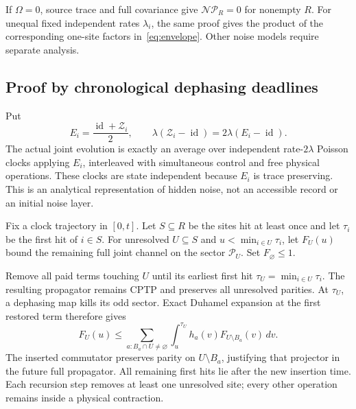 \documentclass[11pt,a4paper]{article}
\newcommand{\id}{\operatorname{id}}
\newcommand{\Pcal}{\mathcal P}
\newcommand{\Ncal}{\mathcal N}
\newcommand{\Zcal}{\mathcal Z}
\begin{document}
If $\Omega=0$, source trace and full covariance give $\Ncal\Pcal_R=0$ for nonempty $R$. For unequal fixed independent rates $\lambda_i$, the same proof gives the product of the corresponding one-site factors in~\eqref{eq:envelope}. Other noise models require separate analysis.

\subsection{Proof by chronological dephasing deadlines}

Put
\begin{equation}
 E_i=\frac{\id+\Zcal_i}{2},\qquad
 \lambda(\Zcal_i-\id)=2\lambda(E_i-\id).
\end{equation}
The actual joint evolution is exactly an average over independent rate-$2\lambda$ Poisson clocks applying $E_i$, interleaved with simultaneous control and free physical operations. These clocks are state independent because $E_i$ is trace preserving. This is an analytical representation of hidden noise, not an accessible record or an initial noise layer.

Fix a clock trajectory in $[0,t]$. Let $S\subseteq R$ be the sites hit at least once and let $\tau_i$ be the first hit of $i\in S$. For unresolved $U\subseteq S$ and $u<\min_{i\in U}\tau_i$, let $F_U(u)$ bound the remaining full joint channel on the sector $\Pcal_U$. Set $F_\varnothing\le1$.

Remove all paid terms touching $U$ until its earliest first hit $\tau_U=\min_{i\in U}\tau_i$. The resulting propagator remains CPTP and preserves all unresolved parities. At $\tau_U$, a dephasing map kills its odd sector. Exact Duhamel expansion at the first restored term therefore gives
\begin{equation}
 F_U(u)\le\sum_{a:B_a\cap U\ne\varnothing}
 \int_u^{\tau_U}h_a(v)F_{U\setminus B_a}(v)\,dv.
 \label{eq:recursion}
\end{equation}
The inserted commutator preserves parity on $U\setminus B_a$, justifying that projector in the future full propagator. All remaining first hits lie after the new insertion time. Each recursion step removes at least one unresolved site; every other operation remains inside a physical contraction.
\end{document}
